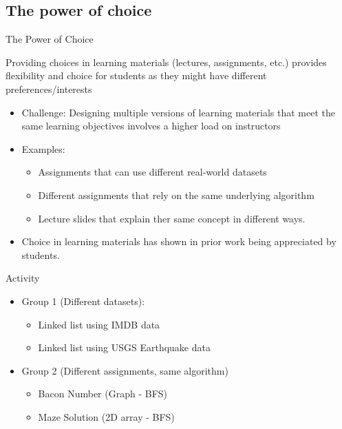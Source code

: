 \documentclass[aspectratio=169]{beamer}
\begin{document}
\subsection{The power of choice}
\begin{frame}{The Power of Choice}
\begin{block}{Providing choices in learning materials (lectures, 
assignments, etc.) provides flexibility and choice for students as they 
might have different preferences/interests}
\end{block}
\begin{itemize}
	\item Challenge: Designing multiple versions of  learning materials 
		that meet the same learning objectives involves a higher 
		load on instructors
	\item Examples: 
		\begin{itemize}
			\item Assignments that can use different real-world datasets
			\item Different assignments that rely on the same 
					underlying algorithm
			\item Lecture slides that explain ther same concept in different 
					ways.
		\end{itemize}
	\item Choice in learning materials has shown in prior work being
		appreciated by students.
\end{itemize}
\end{frame}
\begin{frame}{Activity}
\begin{itemize}
	\item Group 1 (Different datasets):
		\begin{itemize}
			\item Linked list using IMDB data 
			\item Linked list using USGS Earthquake data
		\end{itemize}
	\item Group 2 (Different assignments, same algorithm)
		\begin{itemize}
			\item Bacon Number (Graph - BFS)
			\item Maze  Solution (2D array - BFS)
		\end{itemize}
\end{itemize}
\end{frame}
\end{document}
